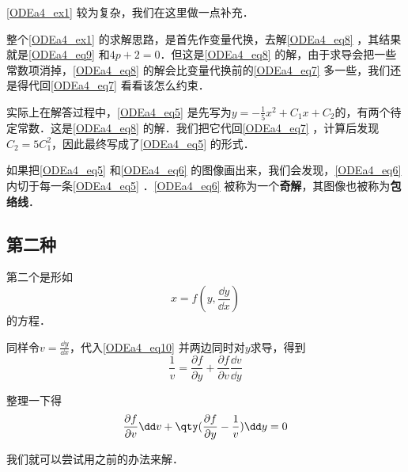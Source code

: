 \autoref{ODEa4_ex1} 较为复杂，我们在这里做一点补充．

整个\autoref{ODEa4_ex1} 的求解思路，是首先作变量代换，去解\autoref{ODEa4_eq8} ，其结果就是\autoref{ODEa4_eq9} 和$4p+2=0$．但这是\autoref{ODEa4_eq8} 的解，由于求导会把一些常数项消掉，\autoref{ODEa4_eq8} 的解会比变量代换前的\autoref{ODEa4_eq7} 多一些，我们还是得代回\autoref{ODEa4_eq7} 看看该怎么约束．

实际上在解答过程中，\autoref{ODEa4_eq5} 是先写为$y=-\frac{1}{5}x^2+C_1x+C_2$的，有两个待定常数．这是\autoref{ODEa4_eq8} 的解．我们把它代回\autoref{ODEa4_eq7} ，计算后发现$C_2=5C_1^2$，因此最终写成了\autoref{ODEa4_eq5} 的形式．

如果把\autoref{ODEa4_eq5} 和\autoref{ODEa4_eq6} 的图像画出来，我们会发现，\autoref{ODEa4_eq6} 内切于每一条\autoref{ODEa4_eq5} 
．\autoref{ODEa4_eq6} 被称为一个\textbf{奇解}，其图像也被称为\textbf{包络线}．

\subsection{第二种}

第二个是形如
\begin{equation}\label{ODEa4_eq10}
x=f(y, \frac{\dd y}{\dd x})
\end{equation}
的方程．

同样令$v=\frac{\dd y}{\dd x}$，代入\autoref{ODEa4_eq10} 并两边同时对$y$求导，得到
\begin{equation}
\frac{1}{v}=\frac{\partial f}{\partial y}+\frac{\partial f}{\partial v}\frac{\dd v}{\dd y}
\end{equation}

整理一下得
\begin{equation}\label{ODEa4_eq13}
\frac{\partial f}{\partial v}\dd v +\qty(\frac{\partial f}{\partial y}-\frac{1}{v})\dd y=0
\end{equation}

我们就可以尝试用之前的办法来解．

